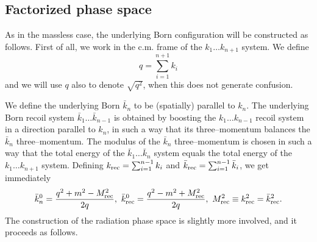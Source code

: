 \documentclass[11pt,a4paper]{article}
\newcommand{\tmop}[1]{\ensuremath{\operatorname{#1}}}
\begin{document}
\subsection{Factorized phase space}

As in the massless case, the underlying Born configuration will be constructed
as follows. First of all, we work in the c.m. frame of the $k_1
\ldots k_{n + 1}$ system. We define
\begin{equation}
  q = \sum_{i = 1}^{n + 1} k_i
\end{equation}
and we will use $q$ also to denote $\sqrt{q^2}$, when this does not generate
confusion.

We define the underlying Born $\bar{k}_n$ to be (spatially) parallel to $k_n$.
The underlying Born recoil system $\bar{k}_1 \ldots \bar{k}_{n - 1}$ is
obtained by boosting the $k_1 \ldots k_{n - 1}$ recoil system in a direction
parallel to $k_n$, in such a way that its three--momentum balances the
$\bar{k}_n$ three--momentum. The modulus of the $\bar{k}_n$ three--momentum is
chosen in such a way that the total energy of the $\bar{k}_1 \ldots \bar{k}_n$
system equals the total energy of the $k_1 \ldots k_{n + 1}$ system. Defining
$k_{\text{{\rmfamily{rec}}}} = \sum_{i = 1}^{n - 1} k_i $ and
$\bar{k}_{\text{{\rmfamily{rec}}}} = \sum_{i = 1}^{n - 1} \bar{k}_i $, we get
immediately
\begin{equation}
  \bar{k}_n^0 = \frac{q^2 + m^2 - M_{\tmop{rec}}^2}{2 q},
  \, \, \bar{k}^0_{\tmop{rec}} = \frac{q^2 - m^2 + M_{\tmop{rec}}^2}{2 q},
  \, \, M_{\tmop{rec}}^2 \equiv k_{\text{\tmtextrm{rec}}}^2 =
  \bar{k}_{\text{\tmtextrm{rec}}}^2 .
\end{equation}
The construction of the radiation phase space is slightly more involved, and
it proceeds as follows.
\end{document}
